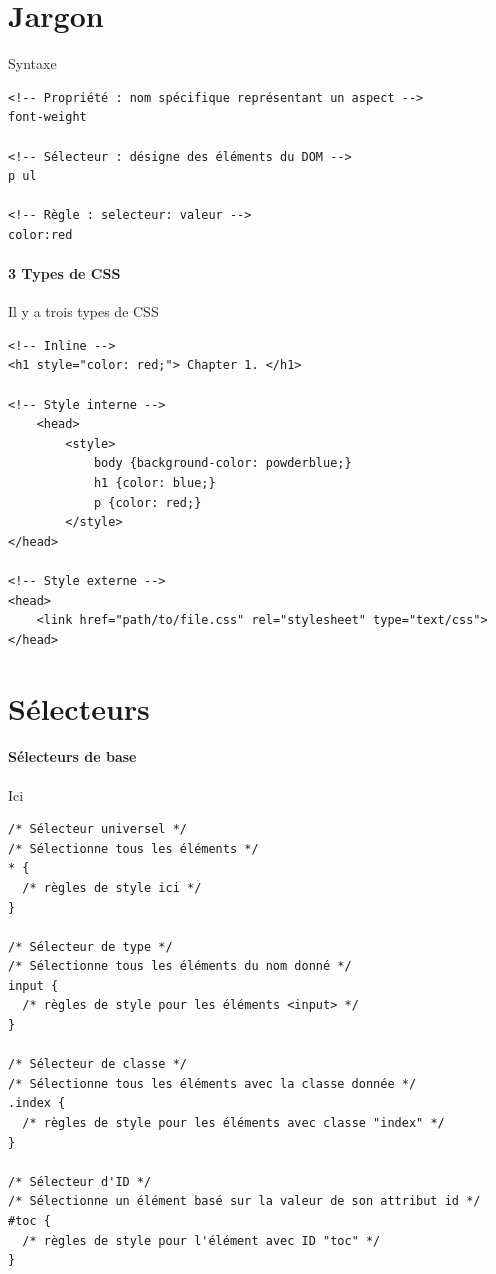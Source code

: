 \documentclass{report}
\begin{document}
\begin{multicols*}{2}
\section{Jargon} 
\begin{EExample}{Syntaxe}{}
   \begin{lstlisting}[style=HTMLDraculaDark]
<!-- Propriété : nom spécifique représentant un aspect --> 
font-weight 

<!-- Sélecteur : désigne des éléments du DOM --> 
p ul 

<!-- Règle : selecteur: valeur --> 
color:red
   \end{lstlisting} 
\end{EExample}

\paragraph{3 Types de CSS}{}
Il y a trois types de CSS
\begin{lstlisting}[style=HTMLDraculaDark]
<!-- Inline --> 
<h1 style="color: red;"> Chapter 1. </h1>

<!-- Style interne -->
    <head>
        <style>
            body {background-color: powderblue;}
            h1 {color: blue;}
            p {color: red;}
        </style>
</head>

<!-- Style externe -->  
<head>
    <link href="path/to/file.css" rel="stylesheet" type="text/css">
</head>
\end{lstlisting}
\section{Sélecteurs}
\paragraph{Sélecteurs de base} Ici

\begin{lstlisting}[style=CSSDraculaLight]
/* Sélecteur universel */
/* Sélectionne tous les éléments */
* {
  /* règles de style ici */
}

/* Sélecteur de type */
/* Sélectionne tous les éléments du nom donné */
input {
  /* règles de style pour les éléments <input> */
}

/* Sélecteur de classe */
/* Sélectionne tous les éléments avec la classe donnée */
.index {
  /* règles de style pour les éléments avec classe "index" */
}

/* Sélecteur d'ID */
/* Sélectionne un élément basé sur la valeur de son attribut id */
#toc {
  /* règles de style pour l'élément avec ID "toc" */
}


\end{lstlisting}
\end{multicols*}
\end{document}
